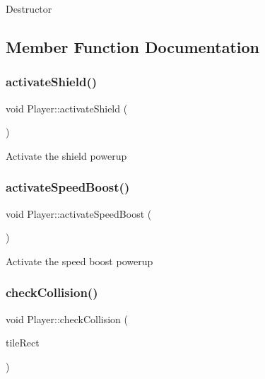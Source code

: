 Destructor 



\subsection{Member Function Documentation}
\mbox{\label{class_player_ad163355044810f54a774431682a1e0ea}} 
\subsubsection{\texorpdfstring{activateShield()}{activateShield()}}
{\footnotesize\ttfamily void Player\+::activate\+Shield (\begin{DoxyParamCaption}{ }\end{DoxyParamCaption})}



Activate the shield powerup 

\mbox{\label{class_player_a5f4304a0c7f0a12489a466d6ab44347d}} 
\subsubsection{\texorpdfstring{activateSpeedBoost()}{activateSpeedBoost()}}
{\footnotesize\ttfamily void Player\+::activate\+Speed\+Boost (\begin{DoxyParamCaption}{ }\end{DoxyParamCaption})}



Activate the speed boost powerup 

\mbox{\label{class_player_a80d38f6cc31168b3a10fad95396baa46}} 
\subsubsection{\texorpdfstring{checkCollision()}{checkCollision()}}
{\footnotesize\ttfamily void Player\+::check\+Collision (\begin{DoxyParamCaption}\item[{sf\+::\+Float\+Rect}]{tile\+Rect }\end{DoxyParamCaption})}



